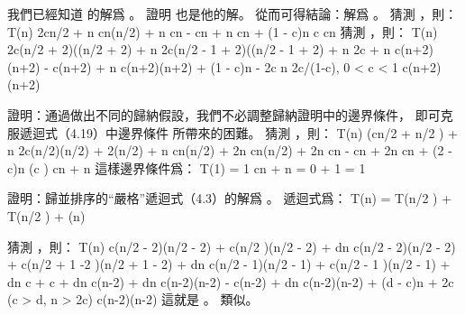 \startEXERCISE
我們已經知道  的解爲 。
證明  也是他的解。
從而可得結論：解爲 。
\stopEXERCISE
\startANSWER
猜測 ，則：
\startformula\startalign
\NC T(n) \NC \le 2c\lfloor n/2 \rfloor{} + n \NR
\NC      \NC \le cn\lg(n/2) + n \NR
\NC      \NC \le cn - cn + n \NR
\NC      \NC \le cn + (1 - c)n \qquad {} c  \NR
\NC      \NC \le cn \NR
\stopalign\stopformula
猜測 ，則：
\startformula\startalign
\NC T(n) \NC \ge 2c(\lfloor n/2 \rfloor + 2)(\lg(\lfloor n/2 \rfloor + 2) + n \NR
\NC      \NC \ge 2c(n/2 - 1 + 2)(\lg(n/2 - 1 + 2) + n \NR
\NC      \NC \ge 2c\lg{} + n \NR
\NC      \NC \ge c(n+2)\lg(n+2) - c(n+2) + n \NR
\NC      \NC \ge c(n+2)\lg(n+2) + (1 - c)n - 2c \qquad {} n \ge 2c/(1-c), 0 < c < 1 \NR
\NC      \NC \ge c(n+2)\lg(n+2) \NR
\stopalign\stopformula
\stopANSWER

\startEXERCISE
證明：通過做出不同的歸納假設，我們不必調整歸納證明中的邊界條件，
即可克服遞迴式（4.19）中邊界條件  所帶來的困難。
\stopEXERCISE
\startANSWER
猜測 ，則：
\startformula\startalign
\NC T(n) \NC {}(c\lfloor n/2 \rfloor{} + \lfloor n/2 \rfloor) + n \NR
\NC      \NC \le 2c(n/2)\lg(n/2) + 2(n/2) + n \NR
\NC      \NC \le cn\lg(n/2) + 2n \NR
\NC      \NC \le cn\lg(n/2) + 2n \NR
\NC      \NC \le cn - cn + 2n \NR
\NC      \NC \le cn + (2 - c)n \qquad (c )\NR
\NC      \NC \le cn + n \NR
\stopalign\stopformula
這樣邊界條件爲：
\startformula
T(1) = 1 \le cn + n = 0 + 1 = 1
\stopformula
\stopANSWER

\startEXERCISE
證明：歸並排序的“嚴格”遞迴式（4.3）的解爲 。
\stopEXERCISE
\startANSWER
遞迴式爲：
\startformula
T(n) = T(\lfloor n/2 \rfloor) + T(\lceil n/2 \rceil) + \Theta(n)
\stopformula

猜測 ，則：
\startformula\startalign
\NC T(n) \NC \le c(\lfloor n/2 \rfloor - 2)\lg(\lfloor n/2 \rfloor - 2) + c(\lceil n/2  )\lg(\lceil n/2 \rceil - 2) + dn \NR
\NC      \NC \le c(n/2 - 2)\lg(n/2 - 2) + c(n/2 + 1 -2 )\lg(n/2 + 1 - 2) + dn \NR
\NC      \NC \le c(n/2 - 1)\lg(n/2 - 1) + c(n/2 - 1 )\lg(n/2 - 1) + dn \NR
\NC      \NC \le c\lg{} + c\lg{} + dn \NR
\NC      \NC \le c(n-2)\lg{} + dn \NR
\NC      \NC \le c(n-2)\lg(n-2) - c(n-2) + dn \NR
\NC      \NC \le c(n-2)\lg(n-2) + (d - c)n + 2c \qquad (c > d, n > 2c)\NR
\NC      \NC \le c(n-2)\lg(n-2) \NR
\stopalign\stopformula
這就是 。  類似。
\stopANSWER

